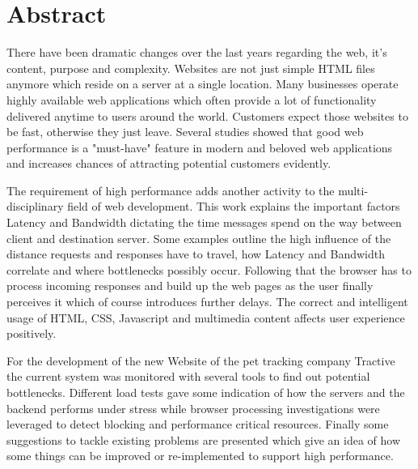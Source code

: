\chapter*{Abstract}

There have been dramatic changes over the last years regarding the web, it's content, purpose and complexity. Websites are not just simple HTML files anymore which reside on a server at a single location. Many businesses operate highly available web applications which often provide a lot of functionality delivered anytime to users around the world. Customers expect those websites to be fast, otherwise they just leave. Several studies showed that good web performance is a "must-have" feature in modern and beloved web applications and increases chances of attracting potential customers evidently. 

The requirement of high performance adds another activity to the multi-disciplinary field of web development. This work explains the important factors Latency and Bandwidth dictating the time messages spend on the way between client and destination server. Some examples outline the high influence of the distance requests and responses have to travel, how Latency and Bandwidth correlate and where bottlenecks possibly occur. Following that the browser has to process incoming responses and build up the web pages as the user finally perceives it which of course introduces further delays. The correct and intelligent usage of HTML, CSS, Javascript and multimedia content affects user experience positively. 

For the development of the new Website of the pet tracking company Tractive the current system was monitored with several tools to find out potential bottlenecks. Different load tests gave some indication of how the servers and the backend performs under stress while browser processing investigations were leveraged to detect blocking and performance critical resources. Finally some suggestions to tackle existing problems are presented which give an idea of how some things can be improved or re-implemented to support high performance.